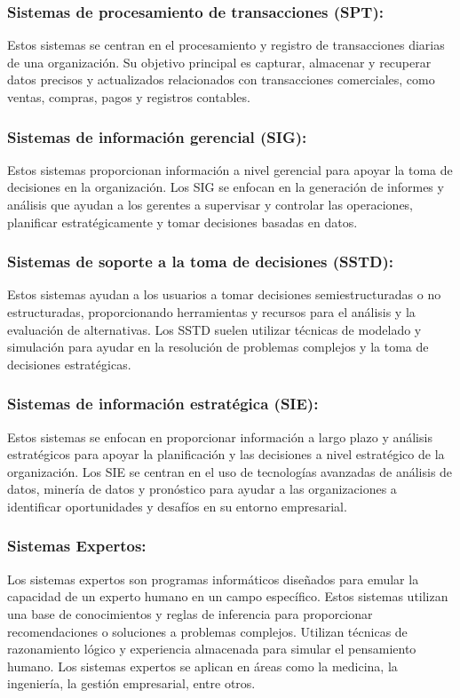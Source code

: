 \documentclass[12pt,a4paper]{article}
\begin{document}
\subsubsection*{Sistemas de procesamiento de transacciones (SPT):} Estos sistemas se centran en el procesamiento y registro de transacciones diarias de una organización. Su objetivo principal es capturar, almacenar y recuperar datos precisos y actualizados relacionados con transacciones comerciales, como ventas, compras, pagos y registros contables.
\cite{kendall}
\subsubsection*{Sistemas de información gerencial (SIG):} Estos sistemas proporcionan información a nivel gerencial para apoyar la toma de decisiones en la organización. Los SIG se enfocan en la generación de informes y análisis que ayudan a los gerentes a supervisar y controlar las operaciones, planificar estratégicamente y tomar decisiones basadas en datos.
\cite{kendall}

\subsubsection*{Sistemas de soporte a la toma de decisiones (SSTD):} Estos sistemas ayudan a los usuarios a tomar decisiones semiestructuradas o no estructuradas, proporcionando herramientas y recursos para el análisis y la evaluación de alternativas. Los SSTD suelen utilizar técnicas de modelado y simulación para ayudar en la resolución de problemas complejos y la toma de decisiones estratégicas.
\cite{kendall}

\subsubsection*{Sistemas de información estratégica (SIE):} Estos sistemas se enfocan en proporcionar información a largo plazo y análisis estratégicos para apoyar la planificación y las decisiones a nivel estratégico de la organización. Los SIE se centran en el uso de tecnologías avanzadas de análisis de datos, minería de datos y pronóstico para ayudar a las organizaciones a identificar oportunidades y desafíos en su entorno empresarial.
\cite{kendall}

\subsubsection*{Sistemas Expertos:} Los sistemas expertos son programas informáticos diseñados para emular la capacidad de un experto humano en un campo específico. Estos sistemas utilizan una base de conocimientos y reglas de inferencia para proporcionar recomendaciones o soluciones a problemas complejos. Utilizan técnicas de razonamiento lógico y experiencia almacenada para simular el pensamiento humano. Los sistemas expertos se aplican en áreas como la medicina, la ingeniería, la gestión empresarial, entre otros.
\cite{kendall}
\end{document}
